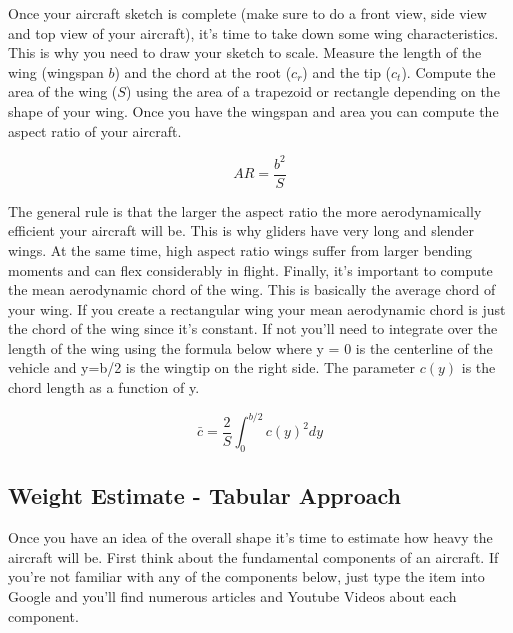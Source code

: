 \documentclass{article}
\begin{document}
Once your aircraft sketch is complete (make sure to do a front view,
side view and top view of your aircraft), it's time to take down some
wing characteristics. This is why you need to draw your sketch to
scale. Measure the length of the wing (wingspan $b$) and the chord at the
root ($c_r$) and the tip ($c_t$). Compute the area of the wing ($S$) using
the area of a trapezoid or rectangle depending on the shape of your
wing. Once you have the wingspan and area you can compute the aspect
ratio of your aircraft.

\begin{equation}
AR = \frac{b^2}{S}
\end{equation}

The general rule is that the larger the aspect ratio the more
aerodynamically efficient your aircraft will be. This is why gliders
have very long and slender wings. At the same time, high aspect ratio
wings suffer from larger bending moments and can flex considerably in
flight. Finally, it's important to compute the mean aerodynamic chord
of the wing. This is basically the average chord of your wing. If you
create a rectangular wing your mean aerodynamic chord is just the
chord of the wing since it's constant. If not you'll need to integrate
over the length of the wing using the formula below where y = 0 is the
centerline of the vehicle and y=b/2 is the wingtip on the right
side\cite{caughey}. The parameter $c(y)$ is the chord length as a
function of y.

\begin{equation}
\bar{c} = \frac{2}{S}\int^{b/2}_0 c(y)^2 dy
\end{equation}

\subsection{Weight Estimate - Tabular Approach}

Once you have an idea of the overall shape it's time to estimate how
heavy the aircraft will be. First think about the fundamental
components of an aircraft. If you're not familiar with any of the
components below, just type the item into Google and you'll find
numerous articles and Youtube Videos about each component.
\end{document}
